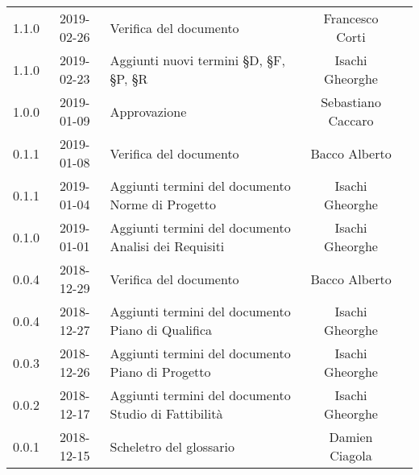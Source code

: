 {\begin{longtable}{ c c  C{4cm}  c  c }
		1.1.0 & 2019-02-26 & Verifica del documento &  Francesco Corti & \ver{}\\
		
		1.1.0 & 2019-02-23 & Aggiunti nuovi termini  \S{D}, \S{F}, \S{P}, \S{R} & Isachi Gheorghe &\reda{}\\
		
		1.0.0 & 2019-01-09 & Approvazione & Sebastiano Caccaro & \Res{}\\
						
		0.1.1 & 2019-01-08 & Verifica del documento & Bacco Alberto & \ver{}\\
		
		0.1.1 & 2019-01-04 & Aggiunti termini del documento Norme di Progetto & Isachi Gheorghe &\reda{}\\
		
		0.1.0 & 2019-01-01 & Aggiunti termini del documento Analisi dei Requisiti & Isachi Gheorghe &\reda{}\\
		
		0.0.4 & 2018-12-29 & Verifica del documento & Bacco Alberto & \ver{}\\
				
		0.0.4 & 2018-12-27 & Aggiunti termini del documento Piano di Qualifica & Isachi Gheorghe &\reda{}\\
				
		0.0.3 & 2018-12-26 &Aggiunti termini del documento Piano di Progetto & Isachi Gheorghe & \reda{}\\
				
		0.0.2 & 2018-12-17 & Aggiunti termini del documento Studio di Fattibilità & Isachi Gheorghe &\reda{}\\
		
		0.0.1 & 2018-12-15 & Scheletro del glossario & Damien Ciagola & \reda{}\\
		
	\end{longtable}

}